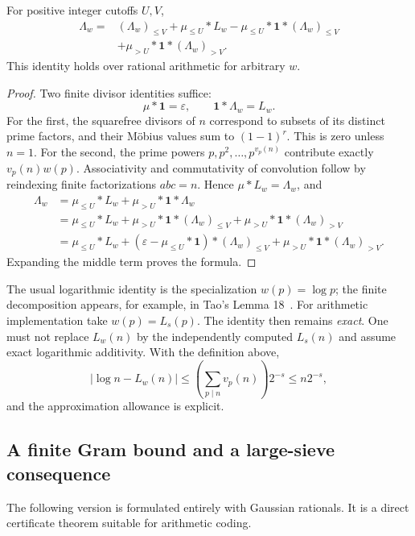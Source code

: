\begin{proposition}
For positive integer cutoffs $U,V$,
\begin{align*}
 \Lambda_w={}&(\Lambda_w)_{\leq V}
        +\mu_{\leq U}*L_w
        -\mu_{\leq U}*\mathbf1*(\Lambda_w)_{\leq V}\\
       &+\mu_{>U}*\mathbf1*(\Lambda_w)_{>V}.
\end{align*}
This identity holds over rational arithmetic for arbitrary $w$.
\end{proposition}
\begin{proof}
Two finite divisor identities suffice:
\[
 \mu*\mathbf1=\varepsilon,\qquad
 \mathbf1*\Lambda_w=L_w.
\]
For the first, the squarefree divisors of $n$ correspond to subsets of
its distinct prime factors, and their M\"obius values sum to
$(1-1)^r$. This is zero unless $n=1$. For the second, the prime powers
$p,p^2,\ldots,p^{v_p(n)}$ contribute exactly $v_p(n)w(p)$.
Associativity and commutativity of convolution follow by reindexing
finite factorizations $abc=n$. Hence $\mu*L_w=\Lambda_w$, and
\begin{align*}
 \Lambda_w
 &=\mu_{\leq U}*L_w+\mu_{>U}*\mathbf1*\Lambda_w\\
 &=\mu_{\leq U}*L_w
   +\mu_{>U}*\mathbf1*(\Lambda_w)_{\leq V}
   +\mu_{>U}*\mathbf1*(\Lambda_w)_{>V}\\
 &=\mu_{\leq U}*L_w
   +(\varepsilon-\mu_{\leq U}*\mathbf1)*(\Lambda_w)_{\leq V}
   +\mu_{>U}*\mathbf1*(\Lambda_w)_{>V}.
\end{align*}
Expanding the middle term proves the formula.
\end{proof}

The usual logarithmic identity is the specialization $w(p)=\log p$;
the finite decomposition appears, for example, in Tao's Lemma
18~\cite{TaoBV2015}. For arithmetic implementation take $w(p)=L_s(p)$.
The identity then remains \emph{exact}. One must not replace $L_w(n)$
by the independently computed $L_s(n)$ and assume exact logarithmic
additivity. With the definition above,
\[
 |\log n-L_w(n)|
 \leq \left(\sum_{p\mid n}v_p(n)\right)2^{-s}\leq n2^{-s},
\]
and the approximation allowance is explicit.

\subsection{A finite Gram bound and a large-sieve consequence}

The following version is formulated entirely with Gaussian rationals.
It is a direct certificate theorem suitable for arithmetic coding.

